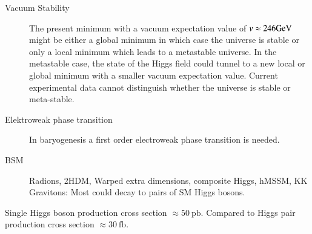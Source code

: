 \begin{description}

\item[Vacuum Stability] The present minimum with a vacuum expectation
  value of $v \approx \si{246}{\ensuremath{\text{GeV}}}$ might be either a global minimum
  in which case the universe is stable or only a local minimum which
  leads to a metastable universe. In the metastable case, the state of
  the Higgs field could tunnel to a new local or global minimum with a
  smaller vacuum expectation value. Current experimental data cannot
  distinguish whether the universe is stable or
  meta-stable.

\item[Elektroweak phase transition] In baryogenesis a first order
  electroweak phase transition is needed.

\item[BSM] Radions, 2HDM, Warped extra dimensions, composite Higgs, hMSSM, KK
  Gravitons: Most could decay to pairs of SM Higgs bosons.

\end{description}

Single Higgs boson production cross section
$\approx \SI{50}{\pico\barn}$. Compared to Higgs pair production cross
section $\approx \SI{30}{\femto\barn}$.






